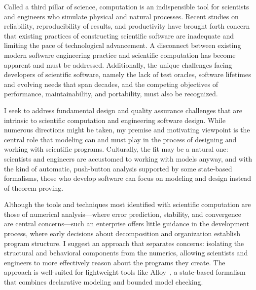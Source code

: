 \documentclass[../../proposal.tex]{subfiles}
\begin{document}
Called a third pillar of science, computation is an indispensible tool
for scientists and engineers who simulate physical and natural
processes.  Recent studies on reliability, reproducibility of results,
and productivity have brought forth concern that existing practices of
constructing scientific software are inadequate and limiting the pace
of technological advancement.  A disconnect between existing modern
software engineering practice and scientific computation has become
apparent and must be addressed.  Additionally, the unique challenges
facing developers of scientific software, namely the lack of test
oracles, software lifetimes and evolving needs that span decades, and
the competing objectives of performance, maintainability, and
portability, must also be recognized.

I seek to address fundamental design and quality assurance challenges
that are intrinsic to scientific computation and engineering software
design.  While numerous directions might be taken, my premise and
motivating viewpoint is the central role that modeling can and must
play in the process of designing and working with scientific programs. 
Culturally, the fit may be a natural one: scientists and engineers are
accustomed to working with models anyway, and with the kind of
automatic, push-button analysis supported by some state-based
formalisms, those who develop software can focus on modeling and design
instead of theorem proving.

Although the tools and techniques most identified with scientific
computation are those of numerical analysis---where error prediction,
stability, and convergence are central concerns---such an enterprise
offers little guidance in the development process, where early
decisions about decomposition and organization establish program
structure.  I suggest an approach that separates concerns: isolating
the structural and behavioral components from the numerics, allowing
scientists and engineers to more effectively reason about the programs
they create.  The approach is well-suited for lightweight tools like
Alloy~\cite{jackson2012}, a state-based formalism that combines
declarative modeling and bounded model checking.
\end{document}
